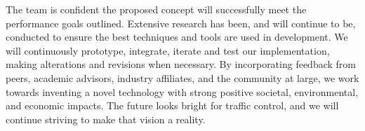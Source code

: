 \documentclass{article}
\begin{document}
The team is confident the proposed concept will successfully meet the performance goals outlined. 
Extensive research has been, and will continue to be, conducted to ensure the best techniques and tools are used in development.
 We will continuously prototype, integrate, iterate and test our implementation, making alterations and revisions when necessary.
By incorporating feedback from peers, academic advisors, industry affiliates, and the community at large, we work towards inventing a novel technology with strong positive societal, environmental, and economic impacts.
 The future looks bright for traffic control, and we will continue striving to make that vision a reality.\\

\newpage
{}




\end{document}
